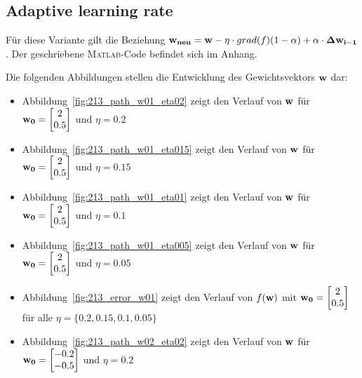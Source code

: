 \clearpage
\newpage
\subsection{Adaptive learning rate}

Für diese Variante gilt die Beziehung $ \mathbf{w_{neu}} = \mathbf{w} - \eta \cdot grad(f)(1-\alpha) +  \alpha \cdot \mathbf{\Delta w_{i-1}}$. Der geschriebene \textsc{Matlab}-Code befindet sich im Anhang.

Die folgenden Abbildungen stellen die Entwicklung des Gewichtsvektors $\mathbf{w}$ dar:

\begin{itemize}
  \item Abbildung~\ref{fig:213_path_w01_eta02} zeigt den Verlauf von $\mathbf{w}$ für $\mathbf{w_0} = \begin{bmatrix} 2 \\ 0.5 \end{bmatrix}$ und $\eta = 0.2$
  \item Abbildung~\ref{fig:213_path_w01_eta015} zeigt den Verlauf von $\mathbf{w}$ für $\mathbf{w_0} = \begin{bmatrix} 2 \\ 0.5 \end{bmatrix}$ und $\eta = 0.15$
  \item Abbildung~\ref{fig:213_path_w01_eta01} zeigt den Verlauf von $\mathbf{w}$ für $\mathbf{w_0} = \begin{bmatrix} 2 \\ 0.5 \end{bmatrix}$ und $\eta = 0.1$
  \item Abbildung~\ref{fig:213_path_w01_eta005} zeigt den Verlauf von $\mathbf{w}$ für $\mathbf{w_0} = \begin{bmatrix} 2 \\ 0.5 \end{bmatrix}$ und $\eta = 0.05$
  \item Abbildung~\ref{fig:213_error_w01} zeigt den Verlauf von $f(\mathbf{w})$ mit $\mathbf{w_0} = \begin{bmatrix} 2 \\ 0.5 \end{bmatrix}$ für alle $\eta = \{0.2, 0.15, 0.1, 0.05\}$
  \item Abbildung~\ref{fig:213_path_w02_eta02} zeigt den Verlauf von $\mathbf{w}$ für $\mathbf{w_0} = \begin{bmatrix} -0.2 \\ -0.5 \end{bmatrix}$ und $\eta = 0.2$

\end{itemize}
